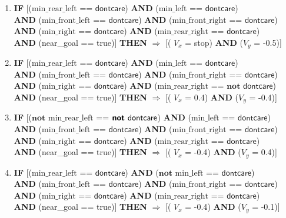 \begin{enumerate}
    \small
	\item \textbf{IF} [($\text{min\_rear\_left}$ == $\textsf{dontcare}$) 
	\textbf{AND} ($\text{min\_left}$ == $\textsf{dontcare}$)\\
	\textbf{AND} ($\text{min\_front\_left}$ == $\textsf{dontcare}$)
	\textbf{AND} ($\text{min\_front\_right}$ == $\textsf{dontcare}$)\\
	\textbf{AND} ($\text{min\_right}$ == $\textsf{dontcare}$) 
	\textbf{AND} ($\text{min\_rear\_right}$ == $\textsf{dontcare}$) \\
	\textbf{AND} (near\_goal == \textsf{true})]
	\textbf{THEN} $\Rightarrow$ [( $V_x$ = \textsf{stop}) \textbf{AND} ($V_y$ = \textsf{-0.5})]
	
	\item \textbf{IF} [($\text{min\_rear\_left}$ == $\textsf{dontcare}$) 
	\textbf{AND} ($\text{min\_left}$ == $\textsf{dontcare}$)\\
	\textbf{AND} ($\text{min\_front\_left}$ == $\textsf{dontcare}$)
	\textbf{AND} ($\text{min\_front\_right}$ == $\textsf{dontcare}$)\\
	\textbf{AND} ($\text{min\_right}$ == $\textsf{dontcare}$) 
	\textbf{AND} ($\text{min\_rear\_right}$ == $\textbf{not } \textsf{dontcare}$)\\
	\textbf{AND} (near\_goal == \textsf{true})]
	\textbf{THEN} $\Rightarrow$ [( $V_x$ = \textsf{0.4}) \textbf{AND} ($V_y$ = \textsf{-0.4})]
	
	\item \textbf{IF} [($\textbf{not }\text{min\_rear\_left}$ == $\textsf{\textbf{not }dontcare}$) 
	\textbf{AND} ($\text{min\_left}$ == $\textsf{dontcare}$)\\
	\textbf{AND} ($\text{min\_front\_left}$ == $\textsf{dontcare}$)
	\textbf{AND} ($\text{min\_front\_right}$ == $\textsf{dontcare}$)\\
	\textbf{AND} ($\text{min\_right}$ == $\textsf{dontcare}$) 
	\textbf{AND} ($\text{min\_rear\_right}$ == $\textsf{dontcare}$)\\
	\textbf{AND} (near\_goal == \textsf{true})]
	\textbf{THEN} $\Rightarrow$ [( $V_x$ = \textsf{-0.4}) \textbf{AND} ($V_y$ = \textsf{0.4})]
	
	\item \textbf{IF} [($\text{min\_rear\_left}$ == $\textsf{dontcare}$) 
	\textbf{AND} ($\textbf{not }\text{min\_left}$ == $\textsf{dontcare}$)\\
	\textbf{AND} ($\text{min\_front\_left}$ == $\textsf{dontcare}$)
	\textbf{AND} ($\text{min\_front\_right}$ == $\textsf{dontcare}$)\\
	\textbf{AND} ($\text{min\_right}$ == $\textsf{dontcare}$) 
	\textbf{AND} ($\text{min\_rear\_right}$ == $\textsf{dontcare}$)\\
	\textbf{AND} (near\_goal == \textsf{true})]
	\textbf{THEN} $\Rightarrow$ [( $V_x$ = \textsf{-0.4}) \textbf{AND} ($V_y$ = \textsf{-0.1})]
	

\end{enumerate}
